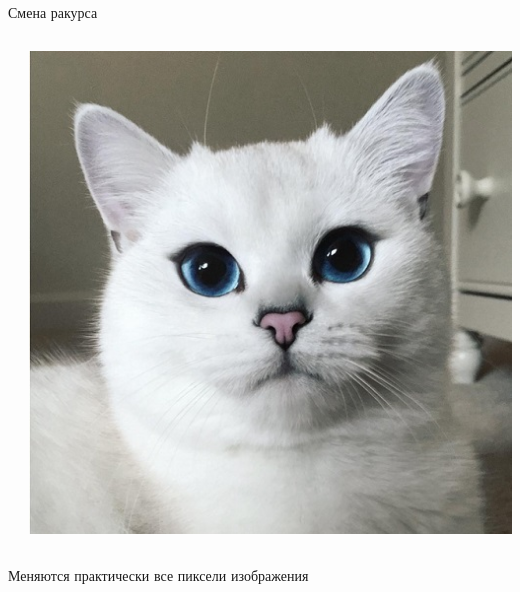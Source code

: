 \documentclass[aspectratio=169, professionalfonts]{beamer}
\begin{document}
\begin{frame}{Смена ракурса}
\begin{columns}
\begin{column}{.325\linewidth}
        \end{column}
        \begin{column}{.325\linewidth}
            \centering
            \includegraphics[width=\linewidth]{figures/fig18-cat.jpg}
        \end{column}
    \end{columns}
    \begin{center}
        Меняются практически все пиксели изображения
    \end{center}
\end{frame}
\end{document}

